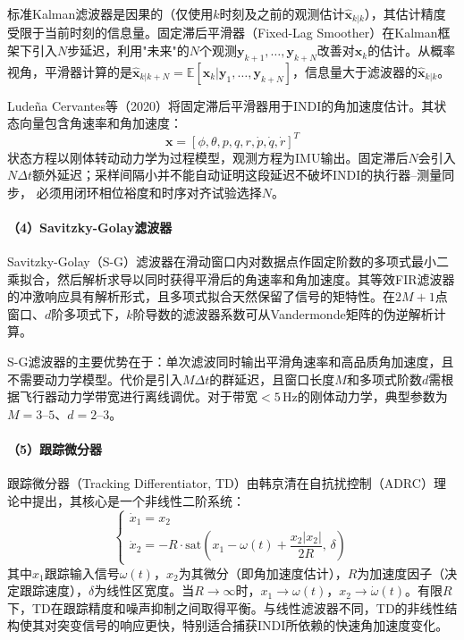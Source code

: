 标准Kalman滤波器是因果的（仅使用$k$时刻及之前的观测估计$\hat{\mathbf{x}}_{k|k}$），其估计精度受限于当前时刻的信息量。固定滞后平滑器（Fixed-Lag Smoother）在Kalman框架下引入$N$步延迟，利用"未来"的$N$个观测$\mathbf{y}_{k+1},\ldots,\mathbf{y}_{k+N}$改善对$\mathbf{x}_k$的估计。从概率视角，平滑器计算的是$\hat{\mathbf{x}}_{k|k+N} = \mathbb{E}[\mathbf{x}_k | \mathbf{y}_1,\ldots,\mathbf{y}_{k+N}]$，信息量大于滤波器的$\hat{\mathbf{x}}_{k|k}$。

Lude\~{n}a Cervantes等（2020）\cite{ludena2020flight}将固定滞后平滑器用于INDI的角加速度估计。其状态向量包含角速率和角加速度：
\begin{equation}
    \mathbf{x} = [\phi, \theta, p, q, r, \dot{p}, \dot{q}, \dot{r}]^T
    \label{eq:fixedlag_state}
\end{equation}
状态方程以刚体转动动力学为过程模型，观测方程为IMU输出。固定滞后$N$会引入
$N\Delta t$额外延迟；采样间隔小并不能自动证明这段延迟不破坏INDI的执行器--测量同步，
必须用闭环相位裕度和时序对齐试验选择$N$。

\paragraph{（4）Savitzky-Golay滤波器}

Savitzky-Golay（S-G）滤波器在滑动窗口内对数据点作固定阶数的多项式最小二乘拟合，然后解析求导以同时获得平滑后的角速率和角加速度。其等效FIR滤波器的冲激响应具有解析形式，且多项式拟合天然保留了信号的矩特性。在$2M+1$点窗口、$d$阶多项式下，$k$阶导数的滤波器系数可从Vandermonde矩阵的伪逆解析计算。

S-G滤波器的主要优势在于：单次滤波同时输出平滑角速率和高品质角加速度，且不需要动力学模型。代价是引入$M\Delta t$的群延迟，且窗口长度$M$和多项式阶数$d$需根据飞行器动力学带宽进行离线调优。对于带宽$<5$\,Hz的刚体动力学，典型参数为$M=3$--$5$、$d=2$--$3$。

\paragraph{（5）跟踪微分器}

跟踪微分器（Tracking Differentiator, TD）由韩京清在自抗扰控制（ADRC）理论中提出，其核心是一个非线性二阶系统：
\begin{equation}
    \begin{cases}
        \dot{x}_1 = x_2 \\
        \dot{x}_2 = -R \cdot \mathrm{sat}\left(x_1 - \omega(t) + \dfrac{x_2|x_2|}{2R},\, \delta\right)
    \end{cases}
    \label{eq:tracking_diff}
\end{equation}
其中$x_1$跟踪输入信号$\omega(t)$，$x_2$为其微分（即角加速度估计），$R$为加速度因子（决定跟踪速度），$\delta$为线性区宽度。当$R\to\infty$时，$x_1\to\omega(t)$，$x_2\to\dot{\omega}(t)$。有限$R$下，TD在跟踪精度和噪声抑制之间取得平衡。与线性滤波器不同，TD的非线性结构使其对突变信号的响应更快，特别适合捕获INDI所依赖的快速角加速度变化。

